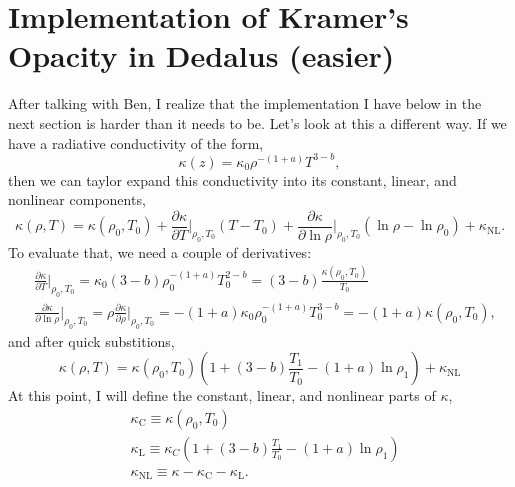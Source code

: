 \documentclass[aps, pre, onecolumn, nofootinbib, notitlepage, groupedaddress, amsfonts, amssymb, amsmath, longbibliography]{revtex4-1}
\begin{document}
\section{Implementation of Kramer's Opacity in Dedalus (easier)}
After talking with Ben, I realize that the implementation I have below in
the next section is harder than it needs to be. Let's look at this a different way.
If we have a radiative conductivity of the form,
\begin{equation}
\kappa(z) = \kappa_0 \rho^{-(1 + a)} T^{3 - b},
\end{equation}
then we can taylor expand this conductivity into its constant, linear, and
nonlinear components,
\begin{equation}
\kappa(\rho, T) = \kappa(\rho_0, T_0) 
+ \frac{\partial \kappa}{\partial T}\bigg|_{\rho_0, T_0}(T - T_0)
+ \frac{\partial \kappa}{\partial \ln\rho}\bigg|_{\rho_0, T_0}(\ln\rho - \ln\rho_0)
+ \kappa_{\text{NL}}.
\end{equation}
To evaluate that, we need a couple of derivatives:
\begin{equation}
\begin{split}
&\frac{\partial \kappa}{\partial T}\bigg|_{\rho_0, T_0} = 
\kappa_0(3-b)\rho_0^{-(1+a)}T_0^{2-b} = (3-b)\frac{\kappa(\rho_0, T_0)}{T_0} \\
&\frac{\partial \kappa}{\partial \ln\rho}\bigg|_{\rho_0, T_0} =
\rho\frac{\partial \kappa}{\partial \rho}\bigg|_{\rho_0, T_0} =
-(1+a)\kappa_0 \rho_0^{-(1+a)} T_0^{3-b} = -(1+a)\kappa(\rho_0, T_0),
\end{split}
\end{equation}
and after quick substitions,
\begin{equation}
\kappa(\rho, T) = \kappa(\rho_0, T_0)\left( 1 +
(3 - b)\frac{T_1}{T_0} - (1 + a) \ln\rho_1 \right)
+ \kappa_{\text{NL}}
\end{equation}
At this point, I will define the constant, linear, and nonlinear parts of $\kappa$,
\begin{equation}
\begin{split}
&\kappa_\text{C} \equiv \kappa(\rho_0, T_0) \\
&\kappa_\text{L} \equiv \kappa_C\left( 1 +
(3 - b)\frac{T_1}{T_0} - (1 + a) \ln\rho_1 \right) \\
&\kappa_{\text{NL}} \equiv \kappa - \kappa_\text{C} - \kappa_{\text{L}}.
\end{split}
\end{equation}
\end{document}
